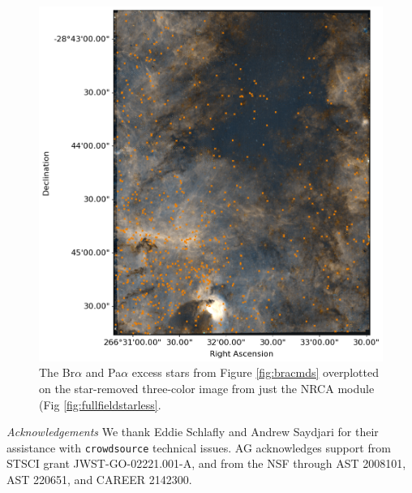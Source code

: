 \documentclass[times,astrosymb]{aastex631}
\begin{document}
\begin{figure}
    \centering
    \includegraphics[width=\textwidth]{figures/BrAExcessStars_on_RGB.png}
    \caption{The Br$\alpha$ and Pa$\alpha$ excess stars from Figure \ref{fig:bracmds} overplotted on the star-removed three-color image from just the NRCA module (Fig \ref{fig:fullfieldstarless}.
    }
    \label{fig:braexcessstars_on_cmd}
\end{figure}

 \textit{Acknowledgements}
 We thank Eddie Schlafly and Andrew Saydjari for their assistance with \texttt{crowdsource} technical issues.
 AG acknowledges support from STSCI grant JWST-GO-02221.001-A, and from the NSF through AST 2008101, AST 220651, and CAREER 2142300.
 

\end{document}
